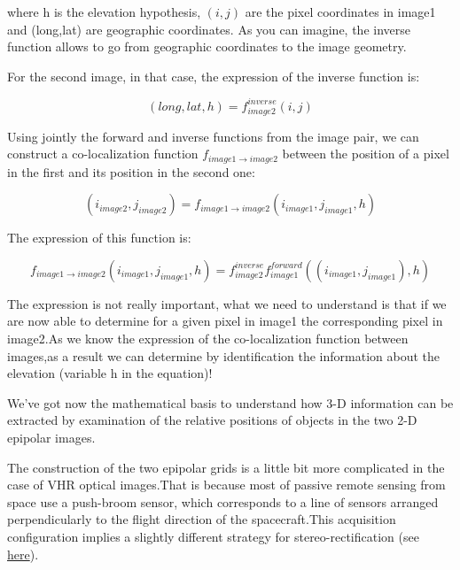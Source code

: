 where h is the elevation hypothesis, $(i,j)$ are the pixel coordinates in image1
and (long,lat) are geographic coordinates. As you can imagine, the inverse
function allows to go from geographic coordinates to the image geometry.

For the second image, in that case, the expression of the inverse function is:

\begin{equation}
   (long,lat,h) = f^{inverse}_{image2}(i,j)
\end{equation}

Using jointly the forward and inverse functions from the image pair, we can
construct a co-localization function $f_{image1 \rightarrow image2}$ between
the position of a pixel in the first and its position in the second one:

\begin{equation}
(i_{image2},j_{image2}) = f_{image1 \rightarrow image2} (i_{image1} , j_{image1} , h)
\end{equation}

The expression of this function is:

\begin{equation}
f_{image1 \rightarrow image2} (i_{image1} , j_{image1} , h) =  f^{inverse}_{image2} f^{forward}_{image1}((i_{image1} , j_{image1}), h)
\end{equation}

The expression is not really important, what we need to understand is that if we
are now able to determine for a given pixel in image1 the corresponding pixel in
image2.As we know the expression of the co-localization function between
images,as a result we can determine by identification the information about the
elevation (variable h in the equation)!

We've got now the mathematical basis to understand how 3-D information can be
extracted by examination of the relative positions of objects in the two 2-D
epipolar images.

The construction of the two epipolar grids is a little bit more complicated in
the case of VHR optical images.That is because most of passive remote sensing from
space use a push-broom sensor, which corresponds to a line of sensors arranged
perpendicularly to the flight direction of the spacecraft.This acquisition
configuration implies a slightly different strategy for stereo-rectification
(see
\href{http://en.wikipedia.org/wiki/Epipolar_geometry#Epipolar_geometry_of_pushbroom_sensor}{here}).

